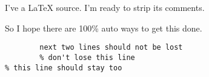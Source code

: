 I've a LaTeX source.
I'm ready %
to strip its comments.

So I hope there are
100\% auto
ways to get this done.

\begin{comment}
   Because there are subtle ways to mess it up.
\end{comment}

\begin{verbatim}
        next two lines should not be lost
        % don't lose this line
% this line should stay too
\end{verbatim}
